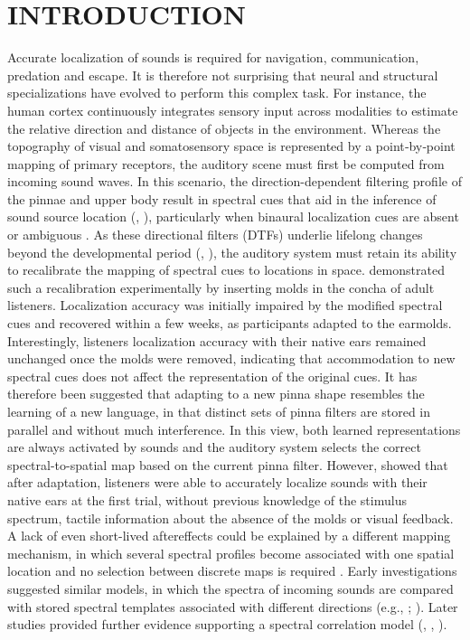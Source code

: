 \section{INTRODUCTION}\label{sec1}%

Accurate localization of sounds is required for navigation, communication, predation and escape. It is therefore not surprising that neural and structural specializations have evolved to perform this complex task. For instance, the human cortex continuously integrates sensory input across modalities to estimate the relative direction and distance of objects in the environment. Whereas the topography of visual and somatosensory space is represented by a point‐by‐point mapping of primary receptors, the auditory scene must first be computed from incoming sound waves. In this scenario, the direction-dependent filtering profile of the pinnae and upper body result in spectral cues that aid in the inference of sound source location (\citet{wightman_headphone_1989},  \citet{blauert_spatial_1996}),  particularly when binaural localization cues are absent \citep{agterberg_contribution_2012} or ambiguous \citep{macpherson_listener_2002}. As these directional filters (DTFs) underlie lifelong changes beyond the developmental period (\citet{otte_age-related_2013}, \citet{clifton_growth_1988}), the auditory system must retain its ability to recalibrate the mapping of spectral cues to locations in space. \citet{hofman_relearning_1998} demonstrated such a recalibration experimentally by inserting molds in the concha of adult listeners. Localization accuracy was initially impaired by the modified spectral cues and recovered within a few weeks, as participants adapted to the earmolds. Interestingly, listeners localization accuracy with their native ears remained unchanged once the molds were removed, indicating that accommodation to new spectral cues does not affect the representation of the original cues. It has therefore been suggested that adapting to a new pinna shape resembles the learning of a new language, in that distinct sets of pinna filters are stored in parallel and without much interference. In this view, both learned representations are always activated by sounds and the auditory system selects the correct spectral-to-spatial map based on the current pinna filter. However, \citet{trapeau_fast_2016} showed that after adaptation, listeners were able to accurately localize sounds with their native ears at the first trial, without previous knowledge of the stimulus spectrum, tactile information about the absence of the molds or visual feedback. A lack of even short-lived aftereffects could be explained by a different mapping mechanism, in which several spectral profiles become associated with one spatial location and no selection between discrete maps is required \citep{trapeau_fast_2016}. Early investigations suggested similar models, in which the spectra of incoming sounds are compared with stored spectral templates associated with different directions (e.g., \citet{blauert_sound_1969}; \citet{hebrank_spectral_1974}). Later studies provided further evidence supporting a spectral correlation model (\citet{middlebrooks_narrow-band_1992}, \citet{langendijk_contribution_2002}, \citet{baumgartner_modeling_2014}). 